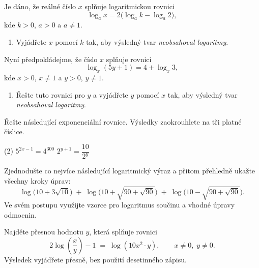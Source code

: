 \begin{exercise}
Je dáno, že reálné číslo $x$ splňuje logaritmickou rovnici
\[
    \log_{a} x = 2\bigl(\log_{a} k - \log_{a} 2\bigr),
\]
kde $k>0$, $a>0$ a $a \neq 1$.

\begin{enumerate}[label=\alph*)]
    \item Vyjádřete $x$ pomocí $k$ tak, aby výsledný tvar \emph{neobsahoval logaritmy}.
\end{enumerate}

Nyní předpokládejme, že číslo $x$ splňuje rovnici
\[
    \log_{x} (5y + 1) = 4 + \log_{x} 3,
\]
kde $x>0$, $x \neq 1$ a $y>0$, $y \neq 1$.

\begin{enumerate}[label=\alph*),start=2]
    \item Řešte tuto rovnici pro $y$ a vyjádřete $y$ pomocí $x$ tak, aby výsledný tvar \emph{neobsahoval logaritmy}.
\end{enumerate}
\end{exercise}


\begin{exercise}
    Řešte následující exponenciální rovnice. Výsledky zaokrouhlete na tři platné číslice.
    \begin{tasks}(2)
        \task $5^{2x - 1} = 4^{300}$
        \task $2^{y+1} = \dfrac{10}{2^{y}}$
    \end{tasks}
\end{exercise}


\begin{exercise}
    Zjednodušte co nejvíce následující logaritmický výraz a přitom přehledně ukažte všechny kroky úprav:
    \[
        \log\bigl(10 + 3\sqrt{10}\bigr)
        \;+\;
        \log\bigl(10 + \sqrt{90 + \sqrt{90}}\bigr)
        \;+\;
        \log\bigl(10 - \sqrt{90 + \sqrt{90}}\bigr).
    \]
    Ve svém postupu využijte vzorce pro logaritmus součinu a vhodné úpravy odmocnin.
\end{exercise}


\begin{exercise}
    Najděte přesnou hodnotu $y$, která splňuje rovnici
    \[
        2\log\!\left(\frac{x}{y}\right) - 1
        \;=\;
        \log\!\left(10x^{2} \cdot y\right),
        \qquad x \ne 0,\; y \ne 0.
    \]
    Výsledek vyjádřete přesně, bez použití desetinného zápisu.
\end{exercise}


